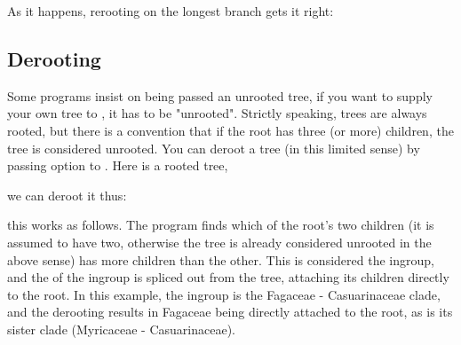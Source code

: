 As it happens, rerooting on the longest branch gets it right:



\subsection{Derooting}

Some programs insist on being passed an unrooted tree, \eg{} if you want to
supply your own tree to \phyml, it has to be "unrooted". Strictly speaking,
\nw{} trees are always rooted, but there is a convention that if the root has
three (or more) children, the tree is considered unrooted. You can deroot a
tree (in this limited sense) by passing option  to \reroot{}. Here
is a rooted tree, 


we can deroot it thus:


this works as follows. The program finds which of the root's two children (it
is assumed to have two, otherwise the tree is already considered unrooted in
the above sense) has more children than the other. This is considered the
ingroup, and the \lca{} of the ingroup is spliced out from the tree, attaching
its children directly to the root. In this example, the ingroup is the Fagaceae
- Casuarinaceae clade, and the derooting results in Fagaceae being directly
attached to the root, as is its sister clade (Myricaceae - Casuarinaceae).

